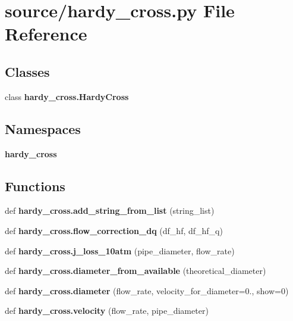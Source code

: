\section{source/hardy\+\_\+cross.py File Reference}
\label{hardy__cross_8py}
\subsection*{Classes}
\begin{DoxyCompactItemize}
\item 
class \textbf{ hardy\+\_\+cross.\+Hardy\+Cross}
\end{DoxyCompactItemize}
\subsection*{Namespaces}
\begin{DoxyCompactItemize}
\item 
 \textbf{ hardy\+\_\+cross}
\end{DoxyCompactItemize}
\subsection*{Functions}
\begin{DoxyCompactItemize}
\item 
def \textbf{ hardy\+\_\+cross.\+add\+\_\+string\+\_\+from\+\_\+list} (string\+\_\+list)
\item 
def \textbf{ hardy\+\_\+cross.\+flow\+\_\+correction\+\_\+dq} (df\+\_\+hf, df\+\_\+hf\+\_\+q)
\item 
def \textbf{ hardy\+\_\+cross.\+j\+\_\+loss\+\_\+10atm} (pipe\+\_\+diameter, flow\+\_\+rate)
\item 
def \textbf{ hardy\+\_\+cross.\+diameter\+\_\+from\+\_\+available} (theoretical\+\_\+diameter)
\item 
def \textbf{ hardy\+\_\+cross.\+diameter} (flow\+\_\+rate, velocity\+\_\+for\+\_\+diameter=0., show=0)
\item 
def \textbf{ hardy\+\_\+cross.\+velocity} (flow\+\_\+rate, pipe\+\_\+diameter)
\end{DoxyCompactItemize}

